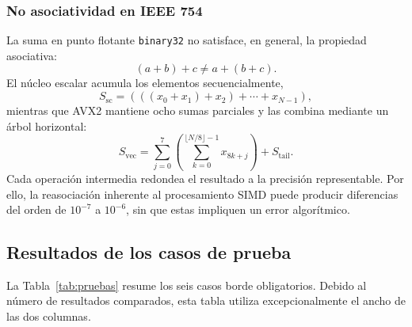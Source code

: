 \documentclass[journal]{IEEEtran}
\begin{document}
\subsubsection{No asociatividad en IEEE 754}

La suma en punto flotante \texttt{binary32} no satisface, en general, la
propiedad asociativa:
\begin{equation}
  (a+b)+c\neq a+(b+c).
  \label{eq:non-associativity}
\end{equation}
El núcleo escalar acumula los elementos secuencialmente,
\begin{equation}
  S_{\mathrm{sc}}=(((x_0+x_1)+x_2)+\cdots+x_{N-1}),
  \label{eq:scalar-order}
\end{equation}
mientras que AVX2 mantiene ocho sumas parciales y las combina mediante un árbol
horizontal:
\begin{equation}
  S_{\mathrm{vec}}=
  \sum_{j=0}^{7}
  \left(\sum_{k=0}^{\lfloor N/8\rfloor-1}x_{8k+j}\right)
  +S_{\mathrm{tail}}.
  \label{eq:vector-order}
\end{equation}
Cada operación intermedia redondea el resultado a la precisión representable.
Por ello, la reasociación inherente al procesamiento SIMD puede producir
diferencias del orden de $10^{-7}$ a $10^{-6}$, sin que estas impliquen un
error algorítmico.

\subsection{Resultados de los casos de prueba}

La Tabla~\ref{tab:pruebas} resume los seis casos borde obligatorios. Debido al
número de resultados comparados, esta tabla utiliza excepcionalmente el ancho
de las dos columnas.
\end{document}
